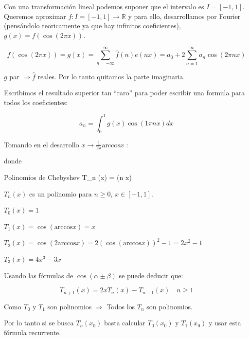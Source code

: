 		Con una transformación lineal podemos suponer que el intervalo es $I = [-1,1]$. Queremos aproximar $f: I = [-1,1] \rightarrow \mathbb{R}$ y para ello, desarrollamos por Fourier (pensándolo teoricamente ya que hay infinitos coeficientes), $g(x) = f(\cos(2 \pi x))$.

		$$f(\cos (2 \pi x)) = g(x) = \sum\limits^{\infty}_{n = -\infty} \hat{f}(n) e(nx) = a_0 + 2 \sum\limits^{\infty}_{n=1} a_n \cos(2 \pi nx)$$

		\begin{obs}
			$g$ par $\Rightarrow \hat{f}$ reales. Por lo tanto quitamos la parte imaginaria.
		\end{obs}

		Escribimos el resultado superior tan ``raro'' para poder escribir una formula para todos los coeficientes:

		$$ a_n = \int^{1}_0 g(x) \cos (1 \pi n x) dx $$

		Tomando en el desarrollo $x \rightarrow \frac{1}{2 \pi} \text{arccos} x$ :

		 donde

		\begin{op}{Polinomios de Chebyshev}
			T_n (x) = \cos (n  x)
		\end{op}

		\begin{obs}
			$T_n (x)$ es un polinomio para $n \geq 0$, $x \in [-1,1]$.
		\end{obs}

		\begin{example}
			$T_0 (x) = 1$

			$T_1 (x) = \cos (\text{arccos} x) = x$

			$T_2 (x) = \cos (2 \text{arccos} x) = 2 (\cos (\text{arccos} x))^2 - 1 = 2x^2 - 1$

			$T_3 (x) = 4x^3 - 3x$
		\end{example}


		Usando las fórmulas de $\cos ( \alpha \pm \beta)$ se puede deducir que:

		$$T_{n+1} (x) = 2 x T_n (x) - T_{n-1} (x) \quad n \geq 1$$

		Como $T_0$ y $T_1$ son polinomios $\Rightarrow$ Todos los $T_n$ son polinomios.

		\begin{obs}
			Por lo tanto si se busca $T_n (x_0)$ basta calcular $T_0 (x_0)$ y $T_1 (x_0)$ y usar esta fórmula recurrente.
		\end{obs}


